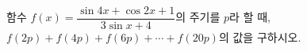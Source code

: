 함수 $f(x)=\dfrac{\sin 4x+\cos 2x+1}{3\sin x+4}$의 주기를 $p$라 할 때, $f(2p)+f(4p)+f(6p)+\cdots+f(20p)$의 값을 구하시오.
